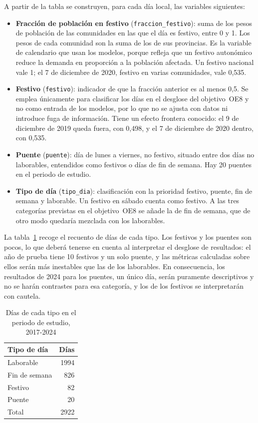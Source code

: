 A partir de la tabla se construyen, para cada día local, las variables
siguientes:
\begin{itemize}
	\item \textbf{Fracción de población en festivo} (\texttt{fraccion\_festivo}):
	suma de los pesos de población de las comunidades en las que el día es
	festivo, entre 0 y 1. Los pesos de cada comunidad son la suma de los de sus
	provincias. Es la variable de calendario que usan los modelos, porque
	refleja que un festivo autonómico reduce la demanda en proporción a la
	población afectada. Un festivo nacional vale 1; el 7 de diciembre de 2020,
	festivo en varias comunidades, vale 0,535.
	\item \textbf{Festivo} (\texttt{festivo}): indicador de que la fracción
	anterior es al menos 0,5. Se emplea únicamente para clasificar los días en
	el desglose del objetivo~OE8 y no como entrada de los modelos, por lo que
	no se ajusta con datos ni introduce fuga de información. Tiene un efecto
	frontera conocido: el 9 de diciembre de 2019 queda fuera, con 0,498, y el
	7 de diciembre de 2020 dentro, con 0,535.
	\item \textbf{Puente} (\texttt{puente}): día de lunes a viernes, no
	festivo, situado entre dos días no laborables, entendidos como festivos o
	días de fin de semana. Hay 20 puentes en el periodo de estudio.
	\item \textbf{Tipo de día} (\texttt{tipo\_dia}): clasificación con la
	prioridad festivo, puente, fin de semana y laborable. Un festivo en sábado
	cuenta como festivo. A las tres categorías previstas en el objetivo~OE8 se
	añade la de fin de semana, que de otro modo quedaría mezclada con los
	laborables.
\end{itemize}

La tabla~\ref{tab:tipos-dia} recoge el recuento de días de cada tipo. Los
festivos y los puentes son pocos, lo que deberá tenerse en cuenta al
interpretar el desglose de resultados: el año de prueba tiene 10 festivos y un
solo puente, y las métricas calculadas sobre ellos
serán más inestables que las de los laborables. En consecuencia, los
resultados de 2024 para los puentes, un único día, serán puramente
descriptivos y no se harán contrastes para esa categoría, y los de los
festivos se interpretarán con cautela.

\begin{table}[htbp]
	\centering
	\caption{Días de cada tipo en el periodo de estudio, 2017-2024}
	\label{tab:tipos-dia}
	\small
	\begin{tabular}{lr}
		\hline
		\textbf{Tipo de día} & \textbf{Días} \\
		\hline
		Laborable & 1994 \\
		Fin de semana & 826 \\
		Festivo & 82 \\
		Puente & 20 \\
		\hline
		Total & 2922 \\
		\hline
	\end{tabular}
\end{table}

